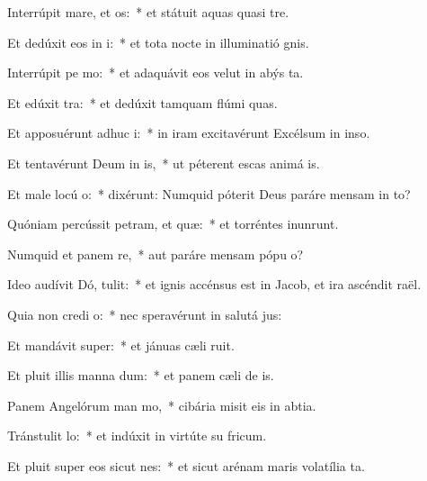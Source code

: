 \item Interrúpit mare, et  os:~* et státuit aquas quasi  tre.
\item Et dedúxit eos in  i:~* et tota nocte in illuminatió gnis.
\item Interrúpit pe  mo:~* et adaquávit eos velut in abýs ta.
\item Et edúxit   tra:~* et dedúxit tamquam flúmi quas.
\item Et apposuérunt adhuc  i:~* in iram excitavérunt Excélsum in inso.
\item Et tentavérunt Deum in  is,~* ut péterent escas animá is.
\item Et male locú   o:~* dixérunt: Numquid póterit Deus paráre mensam in to?
\item Quóniam percússit petram, et  quæ:~* et torréntes inunrunt.
\item Numquid et panem  re,~* aut paráre mensam pópu o?
\item Ideo audívit Dó,  tulit:~* et ignis accénsus est in Jacob, et ira ascéndit  raël.
\item Quia non credi  o:~* nec speravérunt in salutá jus:
\item Et mandávit  super:~* et jánuas cæli ruit.
\item Et pluit illis manna  dum:~* et panem cæli de is.
\item Panem Angelórum man mo,~* cibária misit eis in abtia.
\item Tránstulit   lo:~* et indúxit in virtúte su fricum.
\item Et pluit super eos sicut  nes:~* et sicut arénam maris volatília ta.
